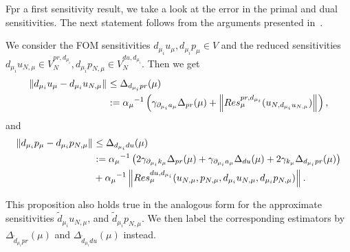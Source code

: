 Fpr a first sensitivity result, we take a look at the error in the primal and dual sensitivities.
The next statement follows from the arguments presented in~\cite[Proposition 3.12, and Proposition 3.13]{Keil2021}.
\begin{proposition}\label{PrDualSensErrProp}
    We consider the FOM sensitivities $d_{\mu_i} u_\mu, d_{\mu_i} p_\mu \in V$ and the reduced sensitivities $d_{\mu_i} u_{N, \mu} \in V_N^{pr, d_{\mu_i}}, d_{\mu_i} p_{N, \mu} \in V_N^{du, d_{\mu_i}}$. Then we get
    \begin{align*}
        \left\lVert d_{\mu_i} u_\mu - d_{\mu_i} u_{N, \mu}\right\rVert_{} &\leq \Delta_{d_{\mu_i} pr}(\mu) \\
        &:= {\alpha_\mu}^{-1} \left( \gamma_{\partial_{\mu_i} a_\mu} \Delta_{pr}(\mu) + \left\lVert Res_\mu^{pr, d_{\mu_i}}(u_{N, d_{\mu_i} u_{N, \mu}})\right\rVert_{} \right),
    \end{align*}
    and
    \begin{align*}
        \left\lVert d_{\mu_i} p_\mu - d_{\mu_i} p_{N, \mu}\right\rVert_{} &\leq \Delta_{d_{\mu_i} du}(\mu) \\
        &:= {\alpha_\mu}^{-1} \left( 2 \gamma_{\partial_{\mu_i} k_\mu} \Delta_{pr}(\mu) + \gamma_{\partial_{\mu_i} a_\mu} \Delta_{du}(\mu) + 2 \gamma_{k_\mu} \Delta_{d_{\mu_i} pr}(\mu) \right) \\
        &+ {\alpha_\mu}^{-1} \left\lVert Res_\mu^{du, d_{\mu_i}}(u_{N, \mu}, p_{N, \mu}, d_{\mu_i} u_{N, \mu}, d_{\mu_i} p_{N, \mu})\right\rVert_{}.
    \end{align*}
\end{proposition}
This proposition also holds true in the analogous form for the approximate sensitivities $\tilde{d}_{\mu_i} u_{N, \mu}$, and $\tilde{d}_{\mu_i} p_{N, \mu}$.
We then label the corresponding estimators by $\Delta_{\tilde{d}_{\mu_i} pr}(\mu)$ and $\Delta_{\tilde{d}_{\mu_i} du}(\mu)$ instead.